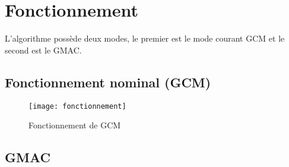 
\chapter{Fonctionnement}
\label{chap:fonctionnement}

L'algorithme \aes possède deux modes, le premier est le mode courant GCM et le second est le GMAC.

\section{Fonctionnement nominal (GCM)}

\begin{figure}[!h]
  \centering
  \texttt{[image: fonctionnement]}
  \caption{Fonctionnement de GCM}
  \label{Fonctionnement de GCM}
\end{figure}

\section{GMAC}



